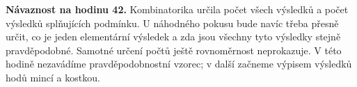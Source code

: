 \documentclass[11pt,a4paper]{article}
\begin{document}

\textbf{Návaznost na hodinu 42.} Kombinatorika určila počet všech výsledků a počet výsledků splňujících podmínku. U náhodného pokusu bude navíc třeba přesně určit, co je jeden elementární výsledek a zda jsou všechny tyto výsledky stejně pravděpodobné. Samotné určení počtů ještě rovnoměrnost neprokazuje. V této hodině nezavádíme pravděpodobnostní vzorec; v další začneme výpisem výsledků hodů mincí a kostkou.
\end{document}
